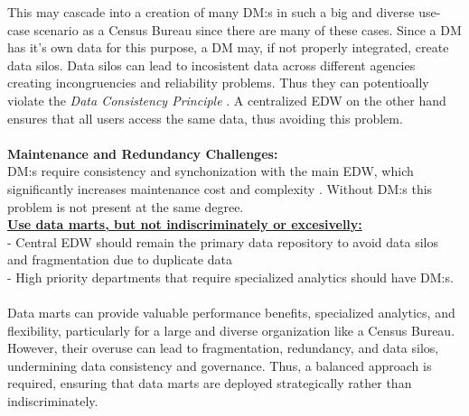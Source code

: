 This may cascade into a creation of many DM:s in such a big and diverse use-case scenario as a Census Bureau since there are many of these cases.
Since a DM has it's own data for this purpose, a DM may, if not properly integrated, create data silos.
Data silos can lead to incosistent data across different agencies creating incongruencies and reliability problems.
Thus they can potentioally violate the \textit{Data Consistency Principle} \cite{l3video}.
A centralized EDW on the other hand ensures that all users access the same data, thus avoiding this problem.
\\\\\textbf{Maintenance and Redundancy Challenges:}\\
DM:s require consistency and synchonization with the main EDW, which significantly increases maintenance cost and complexity \cite[p.1230]{CourseLitt}.
Without DM:s this problem is not present at the same degree.\\


\textbf{\underline{Use data marts, but not indiscriminately or excesivelly:}}\\
- Central EDW should remain the primary data repository to avoid data silos and fragmentation due to duplicate data\\
- High priority departments that require specialized analytics should have DM:s.\\
\\Data marts can provide valuable performance benefits, specialized analytics, and flexibility, 
particularly for a large and diverse organization like a Census Bureau. 
However, their overuse can lead to fragmentation, redundancy, and data silos, 
undermining data consistency and governance. Thus, a balanced approach is required, 
ensuring that data marts are deployed strategically rather than indiscriminately.
